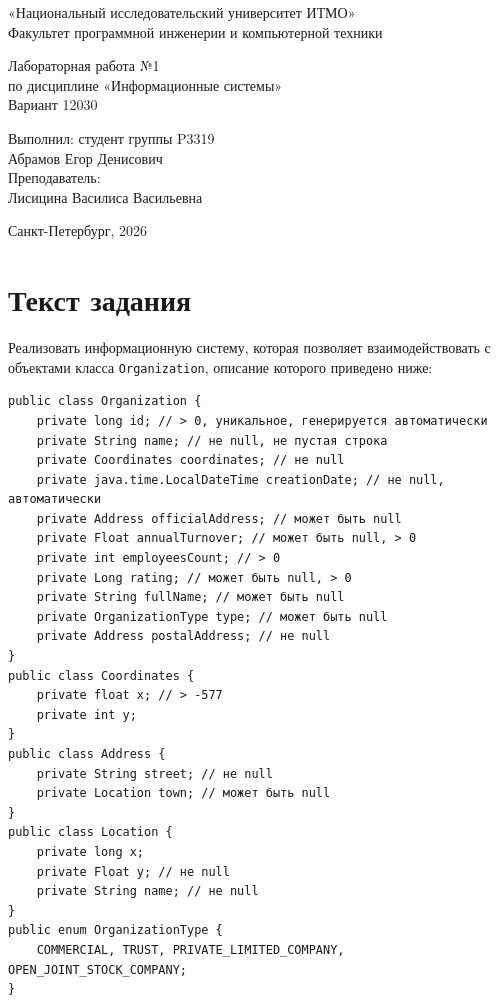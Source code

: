 \documentclass[12pt,a4paper]{article}
\begin{document}
\sloppy

\begin{titlepage}
    \centering
    «Национальный исследовательский университет ИТМО»\\[6pt]
    Факультет программной инженерии и компьютерной техники

    \vfill

    {\Large Лабораторная работа №1}\\[8pt]
    по дисциплине «Информационные системы»\\[8pt]
    Вариант 12030

    \vfill

    \begin{flushright}
        Выполнил: студент группы P3319\\
        Абрамов Егор Денисович\\[12pt]
        Преподаватель:\\
        Лисицина Василиса Васильевна
    \end{flushright}

    \vfill

    Санкт-Петербург, 2026
\end{titlepage}

\section{Текст задания}

Реализовать информационную систему, которая позволяет взаимодействовать с объектами класса \texttt{Organization}, описание которого приведено ниже:

\begin{Verbatim}[frame=single,fontsize=\small]
public class Organization {
    private long id; // > 0, уникальное, генерируется автоматически
    private String name; // не null, не пустая строка
    private Coordinates coordinates; // не null
    private java.time.LocalDateTime creationDate; // не null, автоматически
    private Address officialAddress; // может быть null
    private Float annualTurnover; // может быть null, > 0
    private int employeesCount; // > 0
    private Long rating; // может быть null, > 0
    private String fullName; // может быть null
    private OrganizationType type; // может быть null
    private Address postalAddress; // не null
}
public class Coordinates {
    private float x; // > -577
    private int y;
}
public class Address {
    private String street; // не null
    private Location town; // может быть null
}
public class Location {
    private long x;
    private Float y; // не null
    private String name; // не null
}
public enum OrganizationType {
    COMMERCIAL, TRUST, PRIVATE_LIMITED_COMPANY, OPEN_JOINT_STOCK_COMPANY;
}
\end{Verbatim}
\end{document}
